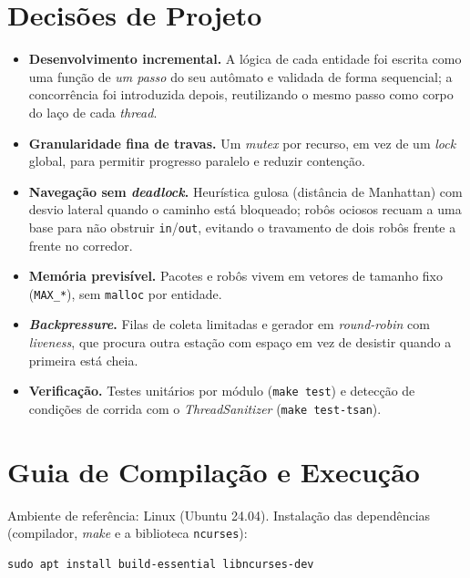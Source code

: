 \documentclass[12pt]{article}
\begin{document}
\section{Decisões de Projeto}

\begin{itemize}
  \item \textbf{Desenvolvimento incremental.} A lógica de cada entidade foi escrita
        como uma função de \emph{um passo} do seu autômato e validada de forma
        sequencial; a concorrência foi introduzida depois, reutilizando o mesmo
        passo como corpo do laço de cada \textit{thread}.
  \item \textbf{Granularidade fina de travas.} Um \textit{mutex} por recurso, em vez
        de um \textit{lock} global, para permitir progresso paralelo e reduzir
        contenção.
  \item \textbf{Navegação sem \textit{deadlock}.} Heurística gulosa (distância de
        Manhattan) com desvio lateral quando o caminho está bloqueado; robôs
        ociosos recuam a uma base para não obstruir \texttt{in}/\texttt{out},
        evitando o travamento de dois robôs frente a frente no corredor.
  \item \textbf{Memória previsível.} Pacotes e robôs vivem em vetores de tamanho
        fixo (\texttt{MAX\_*}), sem \texttt{malloc} por entidade.
  \item \textbf{\textit{Backpressure}.} Filas de coleta limitadas e gerador em
        \textit{round-robin} com \textit{liveness}, que procura outra estação com
        espaço em vez de desistir quando a primeira está cheia.
  \item \textbf{Verificação.} Testes unitários por módulo (\texttt{make test}) e
        detecção de condições de corrida com o \textit{ThreadSanitizer}
        (\texttt{make test-tsan}).
\end{itemize}

\section{Guia de Compilação e Execução}

Ambiente de referência: Linux (Ubuntu 24.04). Instalação das dependências
(compilador, \textit{make} e a biblioteca \texttt{ncurses}):

{\small
\begin{verbatim}
sudo apt install build-essential libncurses-dev
\end{verbatim}
}
\end{document}
